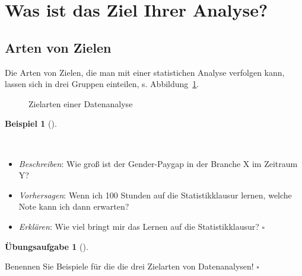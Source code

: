 \documentclass[
  letterpaper,
  oneside,
  open=any]{scrbook}
\providecommand{\tightlist}{%
  \setlength{\itemsep}{0pt}\setlength{\parskip}{0pt}}\usepackage{longtable,booktabs,array}
\theoremstyle{definition}
\newtheorem{exercise}{Übungsaufgabe}[chapter]
\theoremstyle{definition}
\newtheorem{example}{Beispiel}[chapter]
\theoremstyle{definition}
\theoremstyle{remark}
\begin{document}
\section{Was ist das Ziel Ihrer
Analyse?}\label{was-ist-das-ziel-ihrer-analyse}

\subsection{Arten von Zielen}\label{arten-von-zielen}

Die Arten von Zielen, die man mit einer statistichen Analyse verfolgen
kann, lassen sich in drei Gruppen einteilen, s.
Abbildung~\ref{fig-ziele}.

\begin{figure}


\caption{\label{fig-ziele}Zielarten einer Datenanalyse}

\end{figure}%

\begin{example}[]\protect\hypertarget{exm-zielarten}{}\label{exm-zielarten}

~

\begin{itemize}
\tightlist
\item
  \emph{Beschreiben}: Wie groß ist der Gender-Paygap in der Branche X im
  Zeitraum Y?
\item
  \emph{Vorhersagen}: Wenn ich 100 Stunden auf die Statistikklausur
  lernen, welche Note kann ich dann erwarten?
\item
  \emph{Erklären}: Wie viel bringt mir das Lernen auf die
  Statistikklausur? \(\square\)
\end{itemize}

\end{example}

\begin{exercise}[]\protect\hypertarget{exr-ziele-stat}{}\label{exr-ziele-stat}

Benennen Sie Beispiele für die die drei Zielarten von Datenanalysen!
\(\square\)

\end{exercise}
\end{document}
